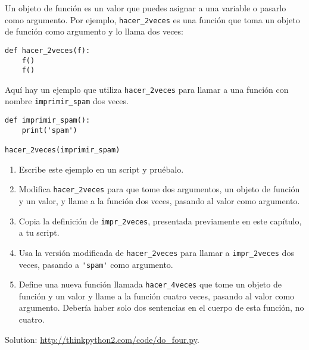 \documentclass[10pt]{book}
\begin{document}
\begin{exercise}

Un objeto de función es un valor que puedes asignar a una variable o
pasarlo como argumento.  Por ejemplo, \verb"hacer_2veces" es una función
que toma un objeto de función como argumento y lo llama dos veces:

\begin{verbatim}
def hacer_2veces(f):
    f()
    f()
\end{verbatim}

Aquí hay un ejemplo que utiliza \verb"hacer_2veces" para llamar a una función
con nombre \verb"imprimir_spam" dos veces.

\begin{verbatim}
def imprimir_spam():
    print('spam')

hacer_2veces(imprimir_spam)
\end{verbatim}

\begin{enumerate}

\item Escribe este ejemplo en un script y pruébalo.

\item Modifica \verb"hacer_2veces" para que tome dos argumentos, un
objeto de función y un valor, y llame a la función dos veces,
pasando al valor como argumento.

\item Copia la definición de
\verb"impr_2veces", presentada previamente en este capítulo, a tu script.

\item Usa la versión modificada de \verb"hacer_2veces" para llamar a
\verb"impr_2veces" dos veces, pasando a \verb"'spam'" como argumento.

\item Define una nueva función llamada
\verb"hacer_4veces" que tome un objeto de función y un valor
y llame a la función cuatro veces, pasando al valor
como argumento.  Debería haber solo
dos sentencias en el cuerpo de esta función, no cuatro.

\end{enumerate}

Solution: \url{http://thinkpython2.com/code/do_four.py}.

\end{exercise}
\end{document}

